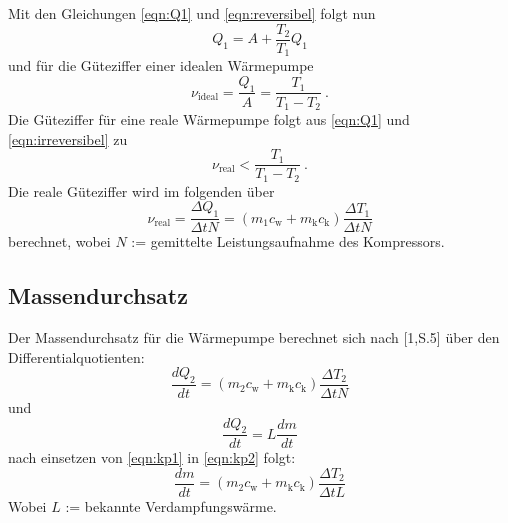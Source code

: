 Mit den Gleichungen \ref{eqn:Q1} und \ref{eqn:reversibel} folgt nun
\begin{equation}
	Q_\text{1} = A + \frac{T_\text{2}}{T_\text{1}} Q_\text{1}
\end{equation}
und für die Güteziffer einer idealen Wärmepumpe
\begin{equation}
	\nu_\text{ideal} = \frac{Q_\text{1}}{A} = \frac{T_\text{1}}{T_\text{1} - T_\text{2}} \ .
	\label{eqn:nuideal}
\end{equation}
Die Güteziffer für eine reale Wärmepumpe folgt aus \ref{eqn:Q1} und \ref{eqn:irreversibel} zu
\begin{equation}
	\nu_\text{real} < \frac{T_\text{1}}{T_\text{1} - T_\text{2}} \ .
\end{equation}
Die reale Güteziffer wird im folgenden über
\begin{equation}
	\nu_\text{real} = \frac{\Delta Q_\text{1}}{\Delta t N} = (m_\text{1} c_\text{w} + m_\text{k} c_\text{k}) \frac{\Delta T_\text{1}}{\Delta t N}
	\label{eqn:nureal}
\end{equation}
berechnet, wobei $N$ := gemittelte Leistungsaufnahme des Kompressors.

\subsection{Massendurchsatz}
Der Massendurchsatz für die Wärmepumpe berechnet sich nach [1,S.5] über den Differentialquotienten:
\begin{equation}
	\label{eqn:kp1}
	\frac{d Q_\text{2}}{d t} = (m_\text{2} c_\text{w} + m_\text{k} c_\text{k}) \frac{\Delta T_\text{2}}{\Delta t N}
\end{equation}
und
\begin{equation}
	\label{eqn:kp2}
	\frac{d Q_\text{2}}{d t} = L \frac{d m}{d t}
\end{equation}
nach einsetzen von \ref{eqn:kp1} in \ref{eqn:kp2} folgt:
\begin{equation}
	\frac{dm}{dt} = (m_\text{2} c_\text{w} + m_\text{k} c_\text{k}) \frac{\Delta T_\text{2}}{\Delta t L}
	\label{eqn:dm/dt}
\end{equation}
Wobei $L$ := bekannte Verdampfungswärme.

